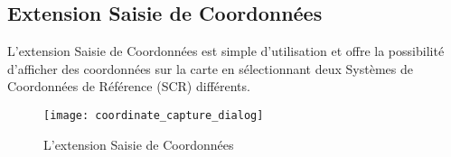 
\subsection{Extension Saisie de Coordonnées}



L'extension Saisie de Coordonnées est simple d'utilisation et offre la
possibilité d'afficher des coordonnées sur la carte en sélectionnant deux
Systèmes de Coordonnées de Référence (SCR) différents.


\begin{figure}[ht]
   \begin{center}
   \caption{L'extension Saisie de Coordonnées \nixcaption}\label{fig:coordinate_capture_dialog}\smallskip
   \texttt{[image: coordinate\_capture\_dialog]}
\end{center}  
\end{figure}

